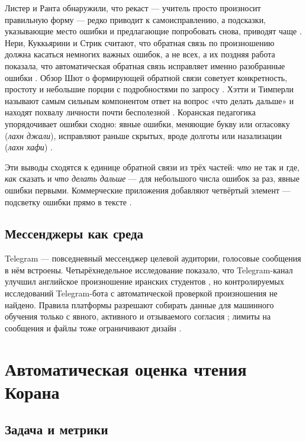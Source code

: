 Листер и Ранта обнаружили, что рекаст --- учитель просто произносит правильную форму --- редко приводит к
самоисправлению, а подсказки, указывающие место ошибки и предлагающие попробовать снова, приводят чаще
\cite{SRC-053}. Нери, Куккьярини и Стрик считают, что обратная связь по произношению должна касаться
немногих важных ошибок, а не всех, а их поздняя работа показала, что автоматическая обратная связь
исправляет именно разобранные ошибки \cite{SRC-054}. Обзор Шют о формирующей обратной связи советует
конкретность, простоту и небольшие порции с подробностями по запросу \cite{SRC-055}. Хэтти и Тимперли
называют самым сильным компонентом ответ на вопрос «что делать дальше» и находят похвалу личности почти
бесполезной \cite{SRC-056}. Коранская педагогика упорядочивает ошибки сходно: явные ошибки, меняющие букву
или огласовку (\emph{лахн джали}), исправляют раньше скрытых, вроде долготы или назализации (\emph{лахн
хафи}) \cite{SRC-052}.

Эти выводы сходятся к единице обратной связи из трёх частей: \emph{что} не так и где, \emph{как} сказать и
\emph{что делать дальше} --- для небольшого числа ошибок за раз, явные ошибки первыми. Коммерческие
приложения добавляют четвёртый элемент --- подсветку ошибки прямо в тексте \cite{SRC-046}.

\subsection{Мессенджеры как среда}

Telegram --- повседневный мессенджер целевой аудитории, голосовые сообщения в нём встроены. Четырёхнедельное
исследование показало, что Telegram-канал улучшил английское произношение иранских студентов
\cite{SRC-092}, но контролируемых исследований Telegram-бота с автоматической проверкой произношения не
найдено. Правила платформы разрешают собирать данные для машинного обучения только с явного, активного и
отзываемого согласия \cite{SRC-033}; лимиты на сообщения и файлы тоже ограничивают дизайн \cite{SRC-060}.

\section{Автоматическая оценка чтения Корана}\label{sec:lr-mdd}

\subsection{Задача и метрики}

